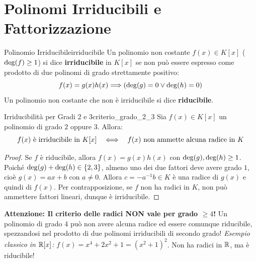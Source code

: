 \section{Polinomi Irriducibili e Fattorizzazione}

\begin{definizione}{Polinomio Irriducibile}{irriducibile}
Un polinomio non costante $f(x) \in K[x]$ ($\operatorname{deg}(f) \ge 1$) si dice \textbf{irriducibile} in $K[x]$ se non può essere espresso come prodotto di due polinomi di grado strettamente positivo:
\[
    f(x) = g(x) h(x) \Longrightarrow (\operatorname{deg}(g) = 0 \vee \operatorname{deg}(h) = 0)
\]
Un polinomio non costante che non è irriducibile si dice \textbf{riducibile}.
\end{definizione}

\begin{proposizione}{Irriducibilità per Gradi 2 e 3}{criterio_grado_2_3}
Sia $f(x) \in K[x]$ un polinomio di grado $2$ oppure $3$. Allora:
\[
    f(x) \text{ è irriducibile in } K[x] \quad \Longleftrightarrow \quad f(x) \text{ non ammette alcuna radice in } K
\]
\end{proposizione}
\begin{proof}
Se $f$ è riducibile, allora $f(x) = g(x)h(x)$ con $\operatorname{deg}(g), \operatorname{deg}(h) \ge 1$.
Poiché $\operatorname{deg}(g) + \operatorname{deg}(h) \in \{2, 3\}$, almeno uno dei due fattori deve avere grado $1$, cioè $g(x) = ax + b$ con $a \neq 0$.
Allora $c = -a^{-1}b \in K$ è una radice di $g(x)$ e quindi di $f(x)$.
Per contrapposizione, se $f$ non ha radici in $K$, non può ammettere fattori lineari, dunque è irriducibile.
\end{proof}

\begin{avvisoCutolo}
    \textbf{Attenzione: Il criterio delle radici NON vale per grado $\ge 4$!}
    Un polinomio di grado 4 può non avere alcuna radice ed essere comunque riducibile, spezzandosi nel prodotto di due polinomi irriducibili di secondo grado!
    \emph{Esempio classico in $\mathbb{R}[x]$:} $f(x) = x^4 + 2x^2 + 1 = (x^2 + 1)^2$. Non ha radici in $\mathbb{R}$, ma è riducibile!
\end{avvisoCutolo}


